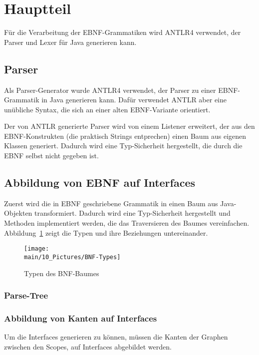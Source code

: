 \documentclass[../InterneDSLs.tex]{subfiles}
\begin{document}
\section{Hauptteil}
Für die Verarbeitung der \ac{EBNF}-Grammatiken wird ANTLR4 verwendet, der Parser und Lexer für Java generieren kann.

\subsection{Parser}
Als Parser-Generator wurde ANTLR4 verwendet, der Parser zu einer EBNF-Grammatik in Java generieren kann. Dafür verwendet ANTLR aber eine unübliche Syntax, die sich an einer alten EBNF-Variante orientiert.

Der von ANTLR generierte Parser wird von einem Listener erweitert, der aus den EBNF-Konstrukten (die praktisch Strings entprechen) einen Baum aus eigenen Klassen generiert. Dadurch wird eine Typ-Sicherheit hergestellt, die durch die EBNF selbst nicht gegeben ist.

\subsection{Abbildung von EBNF auf Interfaces}
Zuerst wird die in EBNF geschriebene Grammatik in einen Baum aus Java-Objekten transformiert. Dadurch wird eine Typ-Sicherheit hergestellt und Methoden implementiert werden, die das Traversieren des Baumes vereinfachen. Abbildung~\ref{FIG:TypesBNF} zeigt die Typen und ihre Beziehungen untereinander.

\begin{figure}[ht]
\centering
\texttt{[image: \\main/10\_Pictures/BNF-Types]}
\caption{Typen des BNF-Baumes}
\label{FIG:TypesBNF}
\end{figure}

\subsubsection{Parse-Tree}


\subsubsection{Abbildung von Kanten auf Interfaces}
Um die Interfaces generieren zu können, müssen die Kanten der Graphen zwischen den Scopes, auf Interfaces abgebildet werden.
\end{document}
